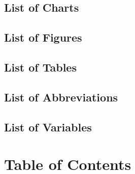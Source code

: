 \documentclass[
	12pt, 
	]{article}
\numberwithin{equation}{section}
\theoremstyle{definition}
\theoremstyle{plain}
\theoremstyle{plain}
\theoremstyle{plain}
\begin{document}
\subsection*{List of Charts} %

\thispagestyle{empty}


\subsection*{List of Figures} %

\thispagestyle{empty}


\subsection*{List of Tables} %

\thispagestyle{empty}


\subsection*{List of Abbreviations} %

\thispagestyle{empty}


\subsection*{List of Variables} %

\thispagestyle{empty}

\newpage


\section*{Table of Contents}

{
	\setlength{\parskip}{1pt}
	\singlespacing
	\tableofcontents
}

\thispagestyle{empty}

\newpage

\end{document}
